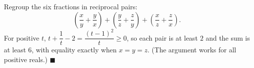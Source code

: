 Regroup the six fractions in reciprocal pairs:
\[
\left(\dfrac {x}{y}+\dfrac {y}{x}\right)+\left(\dfrac {y}{z}+\dfrac {z}{y}\right)+\left(\dfrac {x}{z}+\dfrac {z}{x}\right).
\]
For positive $t$, $t+\dfrac{1}{t}-2=\dfrac{(t-1)^2}{t}\ge0$, so each pair is at least $2$ and the sum is at least $6$, with equality exactly when $x=y=z$. (The argument works for all positive reals.) $\blacksquare$
